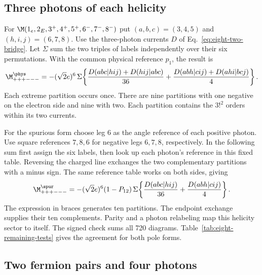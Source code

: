 \subsection{Three photons of each helicity}\label{sec:eight-balanced}

For $\M(1_e,2_E,3^+,4^+,5^+,6^-,7^-,8^-)$ put
$(a,b,c)=(3,4,5)$ and $(h,i,j)=(6,7,8)$. Use the three-photon currents
$D$ of Eq.~\eqref{eq:eight-two-bridge}. Let $\Sigma$ sum the two triples
of labels independently over their six permutations. With the common
physical reference $p_1$, the result is
\begin{align}
 \M^{\phys}_{+++---}=-(\sqrt2 e)^6\,\Sigma\!
 \left\{\frac{D(abc|hij)+D(hij|abc)}{36}
      +\frac{D(abh|cij)+D(ahi|bcj)}{4}\right\}.
 \label{eq:eight-balanced-phys}
\end{align}
Each extreme partition occurs once. There are nine partitions with one
negative on the electron side and nine with two. Each partition contains
the $3!^2$ orders within its two currents.

For the spurious form choose leg 6 as the angle reference of each positive
photon. Use square references $7,8,6$ for negative legs $6,7,8$,
respectively. In the following sum first assign the six labels, then
look up each photon's reference in this fixed table. Reversing the
charged line exchanges the two complementary partitions with a minus
sign. The same reference table works on both sides, giving
\begin{equation}
 \M^{\spur}_{+++---}=-(\sqrt2 e)^6(1-P_{12})\,\Sigma\!
 \left\{\frac{D(abc|hij)}{36}+\frac{D(abh|cij)}4\right\}.
 \label{eq:eight-balanced-spur}
\end{equation}
The expression in braces generates ten partitions. The endpoint
exchange supplies their ten complements. Parity and a photon relabeling
map this helicity sector to itself. The signed check sums all 720 diagrams. Table~\ref{tab:eight-remaining-tests} gives the agreement for both pole forms.

\subsection{Two fermion pairs and four photons}\label{sec:eight-two-pairs}

